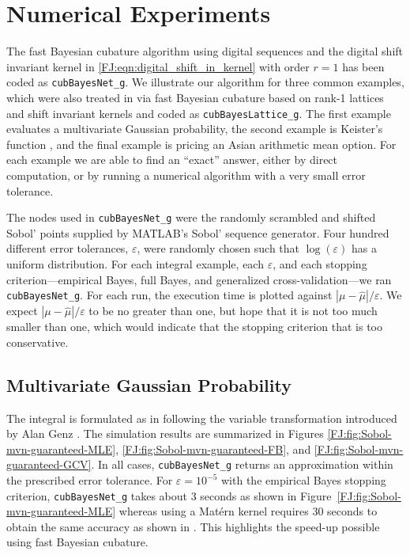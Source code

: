 \documentclass[graybox,footinfo]{svmult}
\newcommand{\abs}[1]{\left\lvert #1 \right\rvert} %
\newcommand{\JRNote}[1]{{\textcolor{green}{JR: #1}}}
\begin{document}
%



\section{Numerical Experiments}

\label{FJ:sec:NumExp}


The fast Bayesian cubature algorithm using digital sequences and the digital shift invariant kernel in \eqref{FJ:eqn:digital_shift_in_kernel} with order $r=1$ has been coded as \texttt{cubBayesNet\_g}.  We illustrate our algorithm for three common examples, which were also treated in \cite{RatHic19a} via fast Bayesian cubature based on rank-1 lattices and shift invariant kernels and coded as \texttt{cubBayesLattice\_g}. The first example evaluates a multivariate Gaussian probability, the second example is Keister's function \cite{Kei96}, and the final example is pricing an Asian arithmetic mean option.  For each example we are able to find an ``exact'' answer, either by direct computation, or by running a numerical algorithm with a very small error tolerance.

The nodes used in \texttt{cubBayesNet\_g} were the randomly scrambled and shifted Sobol' points supplied by MATLAB's Sobol' sequence generator. Four hundred different error tolerances, $\varepsilon$, were randomly chosen such that $\log(\varepsilon)$ has a uniform distribution. 
For each integral example, each $\varepsilon$, and each stopping criterion---empirical Bayes, full Bayes, and generalized cross-validation---we ran \texttt{cubBayesNet\_g}.  For each run, the execution time is plotted against $\abs{\mu - \widehat{\mu}}/\varepsilon$.  We expect $\abs{\mu - \widehat{\mu}}/\varepsilon$ to be no greater than one, but hope that it is not too much smaller than one, which would indicate that the stopping criterion that is too conservative.

\subsection{Multivariate Gaussian Probability}

The integral is formulated as in \cite{RatHic19a} following the variable transformation introduced by Alan Genz \cite{Gen92}. The simulation results are summarized in Figures \ref{FJ:fig:Sobol-mvn-guaranteed-MLE}, \ref{FJ:fig:Sobol-mvn-guaranteed-FB}, and \ref{FJ:fig:Sobol-mvn-guaranteed-GCV}.  In all cases, \texttt{cubBayesNet\_g} returns an approximation within the prescribed error tolerance. For  $\varepsilon=10^{-5}$ with the empirical Bayes stopping criterion, \texttt{cubBayesNet\_g} takes about 3 seconds as shown in Figure~\ref{FJ:fig:Sobol-mvn-guaranteed-MLE} whereas using a Mat\'ern kernel requires 30 seconds to obtain the same accuracy as shown in \cite{RatHic19a}. This highlights the speed-up possible using fast Bayesian cubature.
\end{document}

